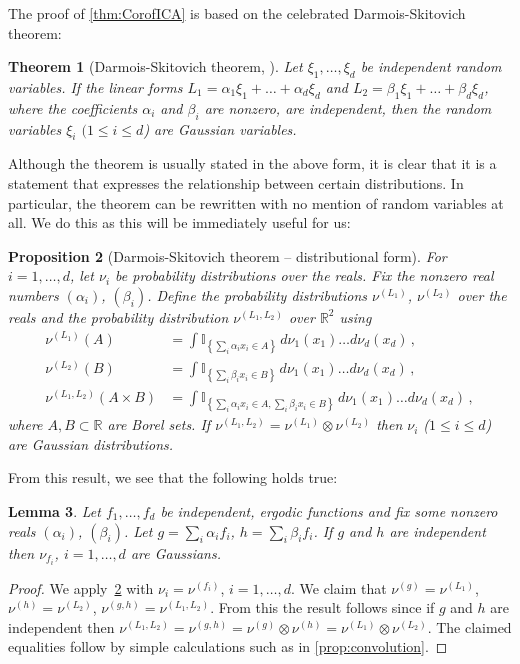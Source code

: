 \documentclass[english]{article} %
\newcommand{\todoc}[2][]{\todo[color=Apricot,#1]{#2}}
\newcommand{\cset}[2]{\left\{#1\,:\,#2\right\}}
\newcommand{\ind}[1]{\mathbb{I}_{\left\{ #1 \right\}}}
\newcommand{\real}{\mathbb{R}}
\newtheorem{lemma}{Lemma}[section]
\newtheorem{thm}[lemma]{Theorem}
\newtheorem{prop}[lemma]{Proposition}
\theoremstyle{definition}
\begin{document}
The proof of \cref{thm:CorofICA} is based on the celebrated Darmois-Skitovich theorem:
\begin{thm}[Darmois-Skitovich theorem, \citep{Darmois53,Skitovich53}]
Let $\xi_1,\ldots,\xi_d$ be independent random variables. If the linear forms $L_1 = \alpha_1\xi_1 + \ldots + \alpha_d\xi_d$ and $L_2 = \beta_1\xi_1 +\ldots + \beta_d\xi_d$, where the coefficients $\alpha_i$ and $\beta_i$ are nonzero, are independent, then the random variables $\xi_i$ $(1\le i \le d$) are Gaussian variables.
\end{thm}
Although the theorem is usually stated in the above form, it is clear that it is a statement that expresses the relationship between certain distributions. In particular, the theorem can be rewritten with no mention of random variables at all. We do this as this will be immediately useful for us:
\begin{prop}[Darmois-Skitovich theorem -- distributional form]
\label{prop:Darmois-Skitovich-distr}
For $i=1,\ldots, d$, let $\nu_i$ be probability distributions over the reals.
Fix the nonzero real numbers $(\alpha_i)$, $(\beta_i)$.
Define the probability distributions $\nu^{(L_1)}$, $\nu^{(L_2)}$ over the reals and 
the probability distribution
 $\nu^{(L_1,L_2)}$ over $\real^2$ using
\begin{align*}
\nu^{(L_1)}(A) & = \int \ind{ \sum_i \alpha_i x_i \in A} \,d\nu_1(x_1)\dots d\nu_d(x_d)\,,\\
\nu^{(L_2)}(B) & = \int \ind{ \sum_i \beta_i x_i \in B} \,d\nu_1(x_1)\dots d\nu_d(x_d)\,,\\
\nu^{(L_1,L_2)}(A\times B) 
& = \int \ind{ \sum_i \alpha_i x_i \in A, \sum_i \beta_i x_i\in B} \,d\nu_1(x_1)\dots d\nu_d(x_d)\,,
\end{align*}
where $A,B\subset \real$ are Borel sets.
If $\nu^{(L_1,L_2)} = \nu^{(L_1)} \otimes \nu^{(L_2)}$ then $\nu_i$ ($1\le i \le d$) are Gaussian distributions.
\end{prop}
From this result, we see that the following holds true:
\begin{lemma}
Let $f_1,\ldots,f_d$ be independent, ergodic functions and fix some nonzero reals
 $(\alpha_i)$, $(\beta_i)$.
Let $g = \sum_i \alpha_i f_i$, $h = \sum_i \beta_i f_i$.
If $g$ and $h$ are independent then $\nu_{f_i}$, $i=1,\ldots,d$ are Gaussians.
\end{lemma}
\begin{proof}
We apply~\cref{prop:Darmois-Skitovich-distr} with $\nu_i = \nu^{(f_i)}$, $i=1,\ldots,d$.
We claim that $\nu^{(g)} = \nu^{(L_1)}$, $\nu^{(h)} = \nu^{(L_2)}$,
$\nu^{(g,h)} = \nu^{(L_1,L_2)}$.
From this the result follows since if $g$ and $h$ are independent then $\nu^{(L_1,L_2)} = \nu^{(g,h)} = \nu^{(g)} \otimes \nu^{(h)} = \nu^{(L_1)} \otimes \nu^{(L_2)}$.
The claimed equalities follow by simple calculations such as in \cref{prop:convolution}. \todoc{At least I think..}
\end{proof}
\end{document}
